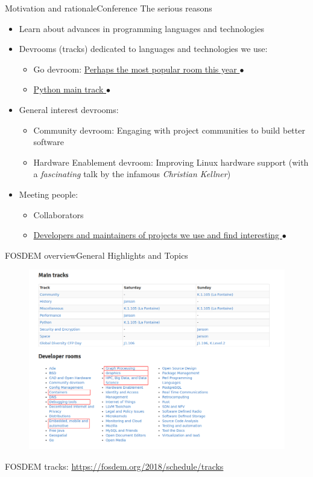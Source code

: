 \documentclass[10pt]{beamer}
\begin{document}
\begin{frame}{Motivation and rationale}{Conference}
    The serious reasons
    \begin{itemize}
        \item Learn about advances in programming languages and technologies
        \item Devrooms (tracks) dedicated to languages and technologies we use:
            \begin{itemize}
                \item Go devroom: \href{./photos/go-devroom-queue.jpg}{Perhaps the most popular room this year $\bullet$}
                \item \href{./photos/python-talk.jpg}{Python main track $\bullet$}
            \end{itemize}
        \item General interest devrooms:
            \begin{itemize}
                \item Community devroom: Engaging with project communities to build better software
                \item Hardware Enablement devroom: Improving Linux hardware support (with a \emph{fascinating} talk by the infamous \emph{Christian Kellner})
            \end{itemize}
        \item Meeting people:
            \begin{itemize}
                \item Collaborators
                \item \href{./photos/collab.jpg}{Developers and maintainers of projects we use and find interesting $\bullet$}
            \end{itemize}
    \end{itemize}
\end{frame}

\begin{frame}{FOSDEM overview}{General Highlights and Topics}
    \begin{figure}
        \includegraphics[width=\textwidth]{tracks-devrooms.png}
    \end{figure}

    FOSDEM tracks: \url{https://fosdem.org/2018/schedule/tracks}
\end{frame}
\end{document}
